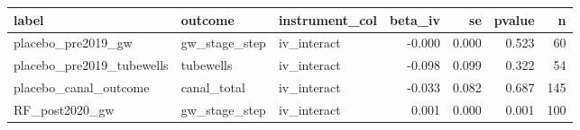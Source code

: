 \begin{tabular}{lllrrrr}
\toprule
label & outcome & instrument_col & beta_iv & se & pvalue & n \\
\midrule
placebo_pre2019_gw & gw_stage_step & iv_interact & -0.000 & 0.000 & 0.523 & 60 \\
placebo_pre2019_tubewells & tubewells & iv_interact & -0.098 & 0.099 & 0.322 & 54 \\
placebo_canal_outcome & canal_total & iv_interact & -0.033 & 0.082 & 0.687 & 145 \\
RF_post2020_gw & gw_stage_step & iv_interact & 0.001 & 0.000 & 0.001 & 100 \\
\bottomrule
\end{tabular}
